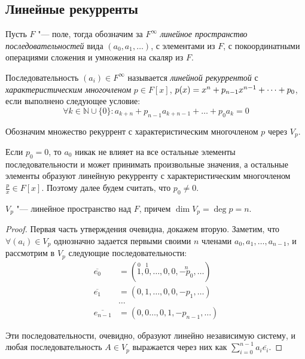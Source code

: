 \subsection{Линейные рекурренты}

\begin{definition}
	Пусть $F$ "--- поле, тогда обозначим за $F^{\infty}$ \textit{линейное пространство последовательностей} вида $(a_0, a_1, \dots)$, с элементами из $F$, с покоординатными операциями сложения и умножения на скаляр из $F$.
\end{definition}

\begin{definition}
	Последовательность $(a_i) \in F^{\infty}$ называется \textit{линейной рекуррентой} с \textit{характеристическим многочленом} $p \in F[x]$, $p(x) = x^n + p_{n - 1}x^{n - 1} \hm{+} \dots + p_0$, если выполнено следующее условие:
	\begin{equation}\tag{$\dagger$}\label{linrec}
		\forall k \in \mathbb{N} \cup \{0\}: a_{k + n} + p_{n - 1}a_{k + n - 1} + \dots + p_0a_k = 0
	\end{equation}
	
	Обозначим множество рекуррент с характеристическим многочленом $p$ через $V_p$.
\end{definition}

\begin{note}
	Если $p_0 = 0$, то $a_0$ никак не влияет на все остальные элементы последовательности и может принимать произвольные значения, а остальные элементы образуют линейную рекурренту с характеристическим многочленом $\frac{p}{x} \in F[x]$. Поэтому далее будем считать, что $p_0 \ne 0$.
\end{note}

\begin{proposition}
	$V_p$ "--- линейное пространство над $F$, причем $\dim{V_p} = \deg{p} = n$.
\end{proposition}

\begin{proof}
	Первая часть утверждения очевидна, докажем вторую. Заметим, что $\forall (a_i) \in V_p$ однозначно задается первыми своими $n$ членами $a_0, a_1, \dots, a_{n - 1}$, и рассмотрим в $V_p$ следующие последовательности:
	\begin{align*}
		\overline{e_0} &= (\overset{0}{1}, \overset{1}{0}, \dotsc, 0, 0, \overset{n}{-p_0}, \dots)\\
		\overline{e_1} &= (0, 1, \dotsc, 0, 0, -p_1, \dots)\\
		&\dotsc\\
		\overline{e_{n - 1}} &= (0, 0\dotsc, 0, 1, -p_{n - 1}, \dots)
	\end{align*}
	
	Эти последовательности, очевидно, образуют линейно независимую систему, и любая последовательность $A \in V_p$ выражается через них как $\sum_{i = 0}^{n - 1}a_i\overline{e_i}$.
\end{proof}

